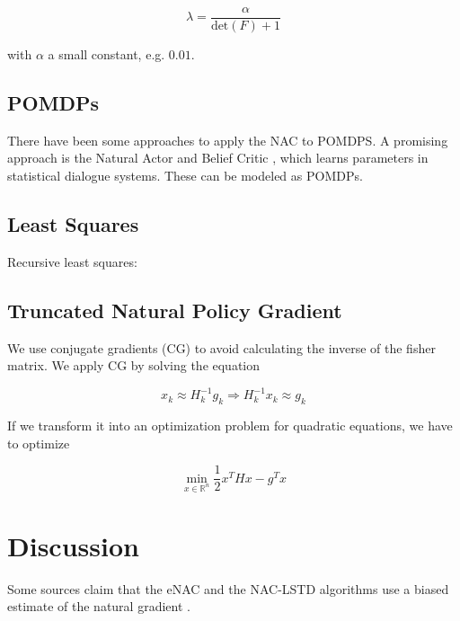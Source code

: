 	\begin{equation}
		\lambda = \dfrac{\alpha}{\text{det}(F) + 1}
	\end{equation}

	\noindent with $\alpha$ a small constant, e.g. $0.01$.
	
	
	\subsection{POMDPs}
	There have been some approaches to apply the NAC to POMDPS. A promising approach is the Natural Actor and Belief Critic \cite{jurvcivcek2011natural}, which learns parameters in statistical dialogue systems. These can be modeled as POMDPs.
	
	\subsection{Least Squares}
	
	Recursive least squares: \cite{park2005rls}
	
	\subsection{Truncated Natural Policy Gradient}
	
	We use conjugate gradients (CG) to avoid calculating the inverse of the fisher matrix. We apply CG by solving the equation
	
	\begin{equation}
		x_k \approx H_k^{-1} g_k \Rightarrow H^{-1}_k x_k \approx g_k
	\end{equation}
	
	If we transform it into an optimization problem for quadratic equations, we have to optimize
	
	\begin{equation}
		\min_{x \in \mathbb{R}^n} \dfrac{1}{2} x^T H x - g^T x
	\end{equation}


\section{Discussion}

Some sources claim that the eNAC and the NAC-LSTD algorithms use a biased estimate of the natural gradient \cite{thomas2014bias}.





\newpage



